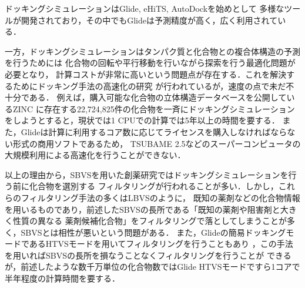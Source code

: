 ドッキングシミュレーションはGlide\cite{Friesner2004}, eHiTS\cite{Zsoldos2007}, AutoDock\cite{Morris2009}を始めとして
多様なツールが開発されており，その中でもGlideは予測精度が高く\cite{Kruger2010}，広く利用されている\cite{Yuriev2013}．

一方，ドッキングシミュレーションはタンパク質と化合物との複合体構造の予測を行うためには
化合物の回転や平行移動を行いながら探索を行う最適化問題が必要となり，
計算コストが非常に高いという問題点が存在する．これを解決するためにドッキング手法の高速化の研究\cite{Kannan2010, McIntosh-Smith2014, Trott2010}
が行われているが，速度の点で未だ不十分である．
例えば，購入可能な化合物の立体構造データベースを公開しているZINC
\cite{Irwin2005}に存在する22,724,825件の化合物を一斉にドッキングシミュレーションをしようとすると，現状では1 CPUでの計算では5年以上の時間を要する．
また，Glideは計算に利用するコア数に応じてライセンスを購入しなければならない形式の商用ソフトであるため，
TSUBAME 2.5などのスーパーコンピュータの大規模利用による高速化を行うことができない．
%

以上の理由から，SBVSを用いた創薬研究ではドッキングシミュレーションを行う前に化合物を選別する
フィルタリングが行われることが多い\cite{Nilakantan1993, Parenti2003}．しかし，これらのフィルタリング手法の多くはLBVSのように，
既知の薬剤などの化合物情報を用いるものであり，前述したSBVSの長所である「既知の薬剤や阻害剤と大きく性質の異なる
薬剤候補化合物」をフィルタリングで落としてしまうことが多く，SBVSとは相性が悪いという問題がある．
また，Glideの簡易ドッキングモードであるHTVSモードを用いてフィルタリングを行うこともあり
\cite{Fujimoto2008}，この手法を用いればSBVSの長所を損なうことなくフィルタリングを行うことが
できるが，前述したような数千万単位の化合物数ではGlide HTVSモードですら1コアで半年程度の計算時間を要する．

